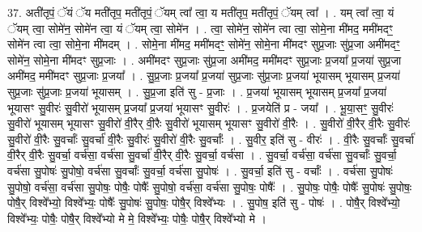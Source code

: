 \documentclass[17pt]{extarticle}
\begin{document}
37. अती॑तृपं॒ ॅयं ॅय मती॑तृप॒ मती॑तृपं॒ ॅयम् त्वा᳚ त्वा॒ य मती॑तृप॒ मती॑तृपं॒ ॅयम् त्वा᳚ । . यम् त्वा᳚ त्वा॒ यं ॅयम् त्वा॒ सोमे॑न॒ सोमे॑न त्वा॒ यं ॅयम् त्वा॒ सोमे॑न । . त्वा॒ सोमे॑न॒ सोमे॑न त्वा त्वा॒ सोमे॒ना मी॑मद॒ ममी॑मदꣳ॒॒ सोमे॑न त्वा त्वा॒ सोमे॒ना मी॑मदम् । . सोमे॒ना मी॑मद॒ ममी॑मदꣳ॒॒ सोमे॑न॒ सोमे॒ना मी॑मदꣳ सुप्र॒जाः सु॑प्र॒जा अमी॑मदꣳ॒॒ सोमे॑न॒ सोमे॒ना मी॑मदꣳ सुप्र॒जाः । . अमी॑मदꣳ सुप्र॒जाः सु॑प्र॒जा अमी॑मद॒ ममी॑मदꣳ सुप्र॒जाः प्र॒जया᳚ प्र॒जया॑ सुप्र॒जा अमी॑मद॒ ममी॑मदꣳ सुप्र॒जाः प्र॒जया᳚ । . सु॒प्र॒जाः प्र॒जया᳚ प्र॒जया॑ सुप्र॒जाः सु॑प्र॒जाः प्र॒जया॑ भूयासम् भूयासम् प्र॒जया॑ सुप्र॒जाः सु॑प्र॒जाः प्र॒जया॑ भूयासम् । . सु॒प्र॒जा इति॑ सु - प्र॒जाः । . प्र॒जया॑ भूयासम् भूयासम् प्र॒जया᳚ प्र॒जया॑ भूयासꣳ सु॒वीरः॑ सु॒वीरो॑ भूयासम् प्र॒जया᳚ प्र॒जया॑ भूयासꣳ सु॒वीरः॑ । . प्र॒जयेति॑ प्र - जया᳚ । . भू॒या॒सꣳ॒॒ सु॒वीरः॑ सु॒वीरो॑ भूयासम् भूयासꣳ सु॒वीरो॑ वी॒रैर् वी॒रैः सु॒वीरो॑ भूयासम् भूयासꣳ सु॒वीरो॑ वी॒रैः । . सु॒वीरो॑ वी॒रैर् वी॒रैः सु॒वीरः॑ सु॒वीरो॑ वी॒रैः सु॒वर्चाः᳚ सु॒वर्चा॑ वी॒रैः सु॒वीरः॑ सु॒वीरो॑ वी॒रैः सु॒वर्चाः᳚ । . सु॒वीर॒ इति॑ सु - वीरः॑ । . वी॒रैः सु॒वर्चाः᳚ सु॒वर्चा॑ वी॒रैर् वी॒रैः सु॒वर्चा॒ वर्च॑सा॒ वर्च॑सा सु॒वर्चा॑ वी॒रैर् वी॒रैः सु॒वर्चा॒ वर्च॑सा । . सु॒वर्चा॒ वर्च॑सा॒ वर्च॑सा सु॒वर्चाः᳚ सु॒वर्चा॒ वर्च॑सा सु॒पोषः॑ सु॒पोषो॒ वर्च॑सा सु॒वर्चाः᳚ सु॒वर्चा॒ वर्च॑सा सु॒पोषः॑ । . सु॒वर्चा॒ इति॑ सु - वर्चाः᳚ । . वर्च॑सा सु॒पोषः॑ सु॒पोषो॒ वर्च॑सा॒ वर्च॑सा सु॒पोषः॒ पोषैः॒ पोषैः᳚ सु॒पोषो॒ वर्च॑सा॒ वर्च॑सा सु॒पोषः॒ पोषैः᳚ । . सु॒पोषः॒ पोषैः॒ पोषैः᳚ सु॒पोषः॑ सु॒पोषः॒ पोषै॒र् विश्वे᳚भ्यो॒ विश्वे᳚भ्यः॒ पोषैः᳚ सु॒पोषः॑ सु॒पोषः॒ पोषै॒र् विश्वे᳚भ्यः । . सु॒पोष॒ इति॑ सु - पोषः॑ । . पोषै॒र् विश्वे᳚भ्यो॒ विश्वे᳚भ्यः॒ पोषैः॒ पोषै॒र् विश्वे᳚भ्यो मे मे॒ विश्वे᳚भ्यः॒ पोषैः॒ पोषै॒र् विश्वे᳚भ्यो मे । \newline
\end{document}

